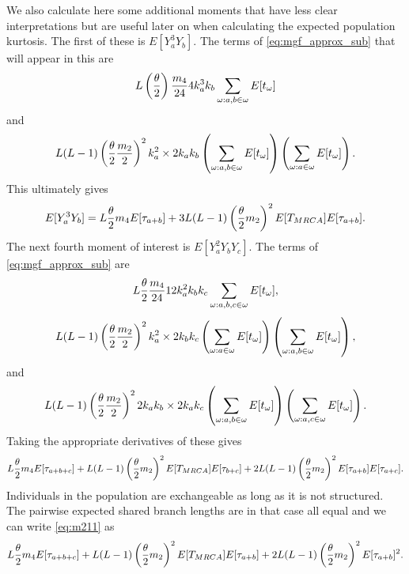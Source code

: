We also calculate here some additional moments that have less clear
interpretations but are useful later on when calculating the expected population
kurtosis. The first of these is $E[Y_a^3Y_b]$. The terms of
\eqref{eq:mgf_approx_sub} that will appear in this are
\begin{equation*}
  L \left(\frac{\theta}{2}\right) \frac{m_4}{24} 4 k_a^3k_b \sum_{\omega:a,b \in \omega} E[t_\omega]
\end{equation*}
and
\begin{equation*}
  L(L-1)\left(\frac{\theta}{2} \frac{m_2}{2}\right)^2 k_a^2 \times 2k_ak_b
  \left( \sum_{\omega:a,b \in \omega} E[t_\omega] \right) \left( \sum_{\omega: a \in \omega} E[t_\omega] \right).
\end{equation*}
This ultimately gives
\begin{equation}
  \label{eq:m31}
  E[Y_a^3Y_b] = L \frac{\theta}{2} m_4 E[\tau_{a+b}] + 3L(L-1) \left(\frac{\theta}{2} m_2\right)^2 E[T_{MRCA}]E[\tau_{a+b}].
\end{equation}
The next fourth moment of interest is $E[Y_a^2Y_bY_c]$. The terms of
\eqref{eq:mgf_approx_sub} are
\begin{equation*}
  L \frac{\theta}{2} \frac{m_4}{24} 12k_a^2k_bk_c \sum_{\omega: a,b,c \in \omega} E[t_\omega],
\end{equation*}
\begin{equation*}
  L(L-1) \left(\frac{\theta}{2} \frac{m_2}{2}\right)^2 k_a^2 \times 2k_bk_c
  \left( \sum_{\omega: a \in \omega} E[t_\omega] \right)\left( \sum_{\omega: a,b \in \omega} E[t_\omega] \right),
\end{equation*}
and 
\begin{equation*}
  L(L-1) \left(\frac{\theta}{2} \frac{m_2}{2}\right)^2 2k_ak_b \times 2k_ak_c \left( \sum_{\omega: a,b \in \omega} E[t_\omega] \right)
  \left( \sum_{\omega: a,c \in \omega} E[t_\omega] \right).
\end{equation*}
Taking the appropriate derivatives of these gives
\begin{equation}
  \label{eq:m211}
  L \frac{\theta}{2} m_4 E[\tau_{a+b+c}] + L(L-1)\left(\frac{\theta}{2} m_2\right)^2E[T_{MRCA}]E[\tau_{b+c}] +
  2L(L-1) \left(\frac{\theta}{2} m_2\right)^2E[\tau_{a+b}]E[\tau_{a+c}].
\end{equation}
Individuals in the population are exchangeable as long as it is not structured.
The pairwise expected shared branch lengths are in that case all equal and we
can write \eqref{eq:m211} as
\begin{equation}
  \label{eq:m211s}
  L \frac{\theta}{2} m_4 E[\tau_{a+b+c}] + L(L-1)\left(\frac{\theta}{2} m_2\right)^2E[T_{MRCA}]E[\tau_{a+b}] +
  2L(L-1) \left(\frac{\theta}{2} m_2\right)^2E[\tau_{a+b}]^2.
\end{equation}
